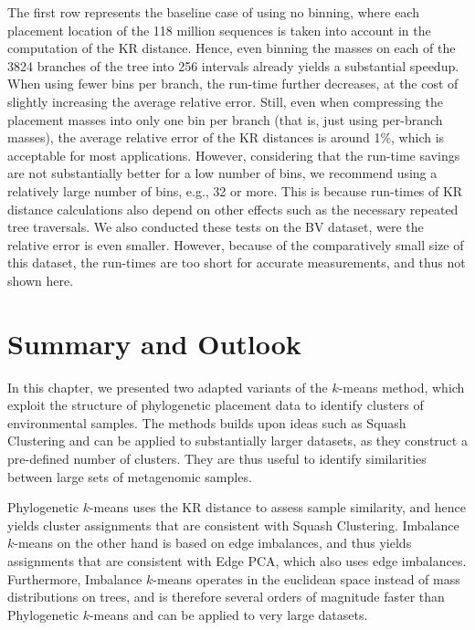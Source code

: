 The first row represents the baseline case of using no binning,
where each placement location of the \num{118} million sequences
is taken into account in the computation of the KR distance.
Hence, even binning the masses on each of the \num{3 824} branches of the tree into \num{256} intervals
already yields a substantial speedup.
When using fewer bins per branch, the run-time further decreases,
at the cost of slightly increasing the average relative error.
Still, even when compressing the placement masses into only one bin per branch (that is, just using per-branch masses),
the average relative error of the KR distances is around 1\%, which is acceptable for most applications.
However, considering that the run-time savings are not substantially better for a low number of bins,
we recommend using a relatively large number of bins, e.g., \num{32} or more.
This is because run-times of KR distance calculations also depend on other effects
such as the necessary repeated tree traversals.
We also conducted these tests on the \ac{BV} dataset, were the relative error is even smaller.
However, because of the comparatively small size of this dataset, the run-times are too short for accurate measurements,
and thus not shown here.


\section{Summary and Outlook}
\label{ch:Clustering:sec:SummaryOutlook}

In this chapter, we presented two adapted variants of the $k$-means method,
which exploit the structure of phylogenetic placement data to identify clusters of environmental samples.
The methods builds upon ideas such as Squash Clustering and can be applied to substantially larger datasets,
as they construct a pre-defined number of clusters.
They are thus useful to identify similarities between large sets of metagenomic samples.

Phylogenetic $k$-means uses the KR distance to assess sample similarity,
and hence yields cluster assignments that are consistent with Squash Clustering.
Imbalance $k$-means on the other hand is based on edge imbalances,
and thus yields assignments that are consistent with Edge PCA, which also uses edge imbalances.
Furthermore, Imbalance $k$-means operates in the euclidean space instead of mass distributions on trees,
and is therefore several orders of magnitude faster than Phylogenetic $k$-means
and can be applied to very large datasets.

